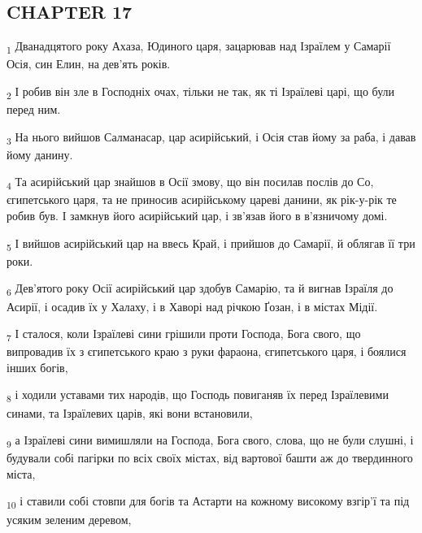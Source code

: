 \subsection{CHAPTER 17}
\begin{tcolorbox}
\textsubscript{1} Дванадцятого року Ахаза, Юдиного царя, зацарював над Ізраїлем у Самарії Осія, син Елин, на дев'ять років.
\end{tcolorbox}
\begin{tcolorbox}
\textsubscript{2} І робив він зле в Господніх очах, тільки не так, як ті Ізраїлеві царі, що були перед ним.
\end{tcolorbox}
\begin{tcolorbox}
\textsubscript{3} На нього вийшов Салманасар, цар асирійський, і Осія став йому за раба, і давав йому данину.
\end{tcolorbox}
\begin{tcolorbox}
\textsubscript{4} Та асирійський цар знайшов в Осії змову, що він посилав послів до Со, єгипетського царя, та не приносив асирійському цареві данини, як рік-у-рік те робив був. І замкнув його асирійський цар, і зв'язав його в в'язничому домі.
\end{tcolorbox}
\begin{tcolorbox}
\textsubscript{5} І вийшов асирійський цар на ввесь Край, і прийшов до Самарії, й облягав її три роки.
\end{tcolorbox}
\begin{tcolorbox}
\textsubscript{6} Дев'ятого року Осії асирійський цар здобув Самарію, та й вигнав Ізраїля до Асирії, і осадив їх у Халаху, і в Хаворі над річкою Ґозан, і в містах Мідії.
\end{tcolorbox}
\begin{tcolorbox}
\textsubscript{7} І сталося, коли Ізраїлеві сини грішили проти Господа, Бога свого, що випровадив їх з єгипетського краю з руки фараона, єгипетського царя, і боялися інших богів,
\end{tcolorbox}
\begin{tcolorbox}
\textsubscript{8} і ходили уставами тих народів, що Господь повиганяв їх перед Ізраїлевими синами, та Ізраїлевих царів, які вони встановили,
\end{tcolorbox}
\begin{tcolorbox}
\textsubscript{9} а Ізраїлеві сини вимишляли на Господа, Бога свого, слова, що не були слушні, і будували собі пагірки по всіх своїх містах, від вартової башти аж до твердинного міста,
\end{tcolorbox}
\begin{tcolorbox}
\textsubscript{10} і ставили собі стовпи для богів та Астарти на кожному високому взгір'ї та під усяким зеленим деревом,
\end{tcolorbox}
